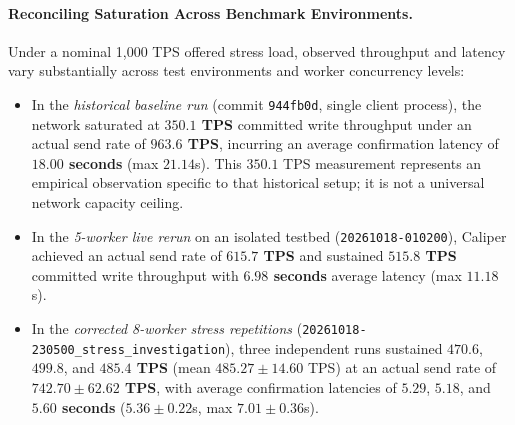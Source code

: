 \documentclass[runningheads]{llncs}
\begin{document}
\paragraph{Reconciling Saturation Across Benchmark Environments.}
Under a nominal 1,000 TPS offered stress load, observed throughput and latency vary substantially across test environments and worker concurrency levels:
\begin{itemize}
    \item In the \textit{historical baseline run} (commit \texttt{944fb0d}, single client process), the network saturated at \textbf{$350.1$ TPS} committed write throughput under an actual send rate of \textbf{$963.6$ TPS}, incurring an average confirmation latency of \textbf{$18.00$ seconds} (max $21.14$s). This $350.1$ TPS measurement represents an empirical observation specific to that historical setup; it is not a universal network capacity ceiling.
    \item In the \textit{5-worker live rerun} on an isolated testbed (\texttt{20261018-010200}), Caliper achieved an actual send rate of \textbf{$615.7$ TPS} and sustained \textbf{$515.8$ TPS} committed write throughput with \textbf{$6.98$ seconds} average latency (max $11.18$s).
    \item In the \textit{corrected 8-worker stress repetitions} (\texttt{20261018-230500\_stress\_investigation}), three independent runs sustained \textbf{$470.6$}, \textbf{$499.8$}, and \textbf{$485.4$ TPS} (mean $485.27 \pm 14.60$ TPS) at an actual send rate of \textbf{$742.70 \pm 62.62$ TPS}, with average confirmation latencies of \textbf{$5.29$}, \textbf{$5.18$}, and \textbf{$5.60$ seconds} ($5.36 \pm 0.22$s, max $7.01 \pm 0.36$s).
\end{itemize}
\end{document}
